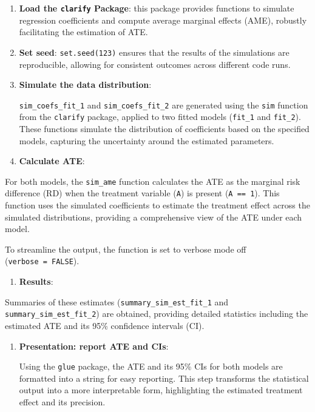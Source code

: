 \documentclass[
  singlecolumn]{article}
\providecommand{\tightlist}{%
  \setlength{\itemsep}{0pt}\setlength{\parskip}{0pt}}\usepackage{longtable,booktabs,array}
\begin{document}
\begin{enumerate}
\def\labelenumi{\arabic{enumi}.}
\item
  \textbf{Load the \texttt{clarify} Package}: this package provides
  functions to simulate regression coefficients and compute average
  marginal effects (AME), robustly facilitating the estimation of ATE.
\item
  \textbf{Set seed}: \texttt{set.seed(123)} ensures that the results of
  the simulations are reproducible, allowing for consistent outcomes
  across different code runs.
\item
  \textbf{Simulate the data distribution}:

  \texttt{sim\_coefs\_fit\_1} and \texttt{sim\_coefs\_fit\_2} are
  generated using the \texttt{sim} function from the \texttt{clarify}
  package, applied to two fitted models (\texttt{fit\_1} and
  \texttt{fit\_2}). These functions simulate the distribution of
  coefficients based on the specified models, capturing the uncertainty
  around the estimated parameters.
\item
  \textbf{Calculate ATE}:
\end{enumerate}

For both models, the \texttt{sim\_ame} function calculates the ATE as
the marginal risk difference (RD) when the treatment variable
(\texttt{A}) is present (\texttt{A\ ==\ 1}). This function uses the
simulated coefficients to estimate the treatment effect across the
simulated distributions, providing a comprehensive view of the ATE under
each model.

To streamline the output, the function is set to verbose mode off
(\texttt{verbose\ =\ FALSE}).

\begin{enumerate}
\def\labelenumi{\arabic{enumi}.}
\setcounter{enumi}{4}
\tightlist
\item
  \textbf{Results}:
\end{enumerate}

Summaries of these estimates (\texttt{summary\_sim\_est\_fit\_1} and
\texttt{summary\_sim\_est\_fit\_2}) are obtained, providing detailed
statistics including the estimated ATE and its 95\% confidence intervals
(CI).

\begin{enumerate}
\def\labelenumi{\arabic{enumi}.}
\setcounter{enumi}{5}
\item
  \textbf{Presentation: report ATE and CIs}:

  Using the \texttt{glue} package, the ATE and its 95\% CIs for both
  models are formatted into a string for easy reporting. This step
  transforms the statistical output into a more interpretable form,
  highlighting the estimated treatment effect and its precision.
\end{enumerate}
\end{document}
